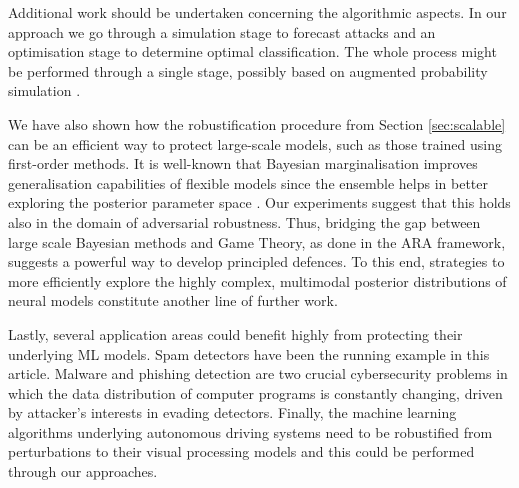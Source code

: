 

Additional work should be undertaken concerning the
algorithmic aspects.  In our approach  we go through a simulation stage to forecast attacks and an optimisation stage to determine optimal classification. The whole process might be performed through a single stage, possibly based on augmented probability simulation \parencite{ekin2019augmented}.

We have also shown how the robustification procedure from Section \ref{sec:scalable} can be an efficient way to protect large-scale models, such as those trained using first-order methods. It is well-known that Bayesian marginalisation improves generalisation capabilities of flexible models since the ensemble helps in better exploring the posterior parameter space \parencite{wilson2020bayesian}. Our experiments suggest 
that this holds also in the domain of adversarial robustness. Thus, bridging the gap between large scale Bayesian methods and Game Theory, as  done in the ARA framework, suggests a powerful way to develop principled defences. To this end, strategies to more efficiently explore the highly complex, multimodal posterior distributions of neural models constitute another line of further work.

Lastly, several application areas could benefit highly from
protecting their underlying ML models. Spam detectors have been
the running example in this article. Malware and phishing detection are two
crucial cybersecurity problems in which the data distribution of computer programs is constantly changing, driven by attacker's interests in evading detectors. Finally, the machine learning algorithms underlying 
autonomous driving systems need to be robustified from perturbations to their visual processing models and this could be performed through our 
approaches.



